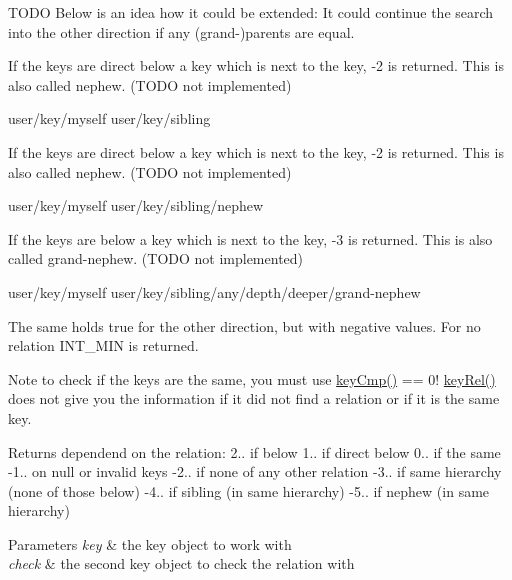 \begin{DoxyCode}
\end{DoxyCode}


T\-O\-D\-O Below is an idea how it could be extended\-: It could continue the search into the other direction if any (grand-\/)parents are equal.


\begin{DoxyItemize}
\item If the keys are direct below a key which is next to the key, -\/2 is returned. This is also called nephew. (T\-O\-D\-O not implemented) \begin{DoxyVerb}user/key/myself
user/key/sibling
\end{DoxyVerb}

\end{DoxyItemize}


\begin{DoxyItemize}
\item If the keys are direct below a key which is next to the key, -\/2 is returned. This is also called nephew. (T\-O\-D\-O not implemented) \begin{DoxyVerb}user/key/myself
user/key/sibling/nephew
\end{DoxyVerb}

\end{DoxyItemize}


\begin{DoxyItemize}
\item If the keys are below a key which is next to the key, -\/3 is returned. This is also called grand-\/nephew. (T\-O\-D\-O not implemented) \begin{DoxyVerb}user/key/myself
user/key/sibling/any/depth/deeper/grand-nephew
\end{DoxyVerb}

\end{DoxyItemize}

The same holds true for the other direction, but with negative values. For no relation I\-N\-T\-\_\-\-M\-I\-N is returned.

\begin{DoxyNote}{Note}
to check if the keys are the same, you must use \hyperlink{group__keytest_gaf6e66e12fe04d535a5d1c8218ced803e}{key\-Cmp()} == 0! \hyperlink{group__keytest_ga6bb0f95ac34ce9c42d61bb35a76139d0}{key\-Rel()} does not give you the information if it did not find a relation or if it is the same key.
\end{DoxyNote}
\begin{DoxyReturn}{Returns}
dependend on the relation\-: 2.. if below 1.. if direct below 0.. if the same -\/1.. on null or invalid keys -\/2.. if none of any other relation -\/3.. if same hierarchy (none of those below) -\/4.. if sibling (in same hierarchy) -\/5.. if nephew (in same hierarchy)
\end{DoxyReturn}

\begin{DoxyParams}{Parameters}
{\em key} & the key object to work with \\
\hline
{\em check} & the second key object to check the relation with \\
\hline
\end{DoxyParams}
